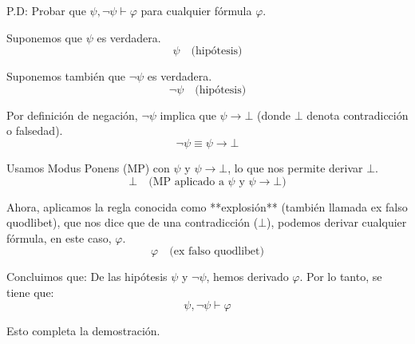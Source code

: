 \begin{solution}
P.D: Probar que $\psi, \neg \psi \vdash \varphi$ para cualquier fórmula $\varphi$.

Suponemos que $\psi$ es verdadera.
\[
\psi \quad \text{(hipótesis)}
\]

Suponemos también que $\neg \psi$ es verdadera.
\[
\neg \psi \quad \text{(hipótesis)}
\]

Por definición de negación, $\neg \psi$ implica que $\psi \to \bot$ (donde $\bot$ denota contradicción o falsedad).
\[
\neg \psi \equiv \psi \to \bot
\]

Usamos Modus Ponens (MP) con $\psi$ y $\psi \to \bot$, lo que nos permite derivar $\bot$.
\[
\bot \quad \text{(MP aplicado a $\psi$ y $\psi \to \bot$)}
\]

Ahora, aplicamos la regla conocida como **explosión** (también llamada ex falso quodlibet), que nos dice que de una contradicción ($\bot$), podemos derivar cualquier fórmula, en este caso, $\varphi$.
\[
\varphi \quad \text{(ex falso quodlibet)}
\]

Concluimos que: De las hipótesis $\psi$ y $\neg \psi$, hemos derivado $\varphi$. Por lo tanto, se tiene que:
\[
\psi, \neg \psi \vdash \varphi
\]

Esto completa la demostración.
\end{solution}